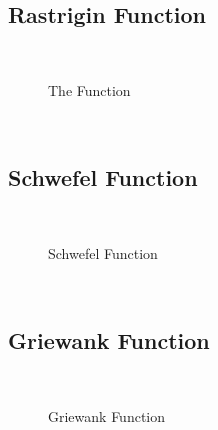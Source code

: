 \subsection{Rastrigin Function}
~
\begin{figure}[ht]
	\centering
	\setlength \fboxsep{0pt}
	\setlength \fboxrule{0.5pt}
	\caption{The Function}
	\label{fig:RastriginGraph}
\end{figure}
~
\subsection{Schwefel Function}
~
\begin{figure}[ht]
	\centering
	\setlength \fboxsep{0pt}
	\setlength \fboxrule{0.5pt}
	\caption{Schwefel Function}
	\label{fig:SchwefelGraph}
\end{figure}
~
\subsection{Griewank Function}
~
\begin{figure}[ht]
	\centering
	\setlength \fboxsep{0pt}
	\setlength \fboxrule{0.5pt}
	\caption{Griewank Function}
	\label{fig:GriewankGraph}
\end{figure}
~
